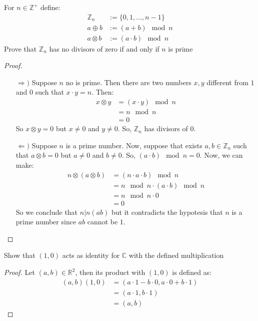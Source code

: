 \documentclass{tufte-handout}
\begin{document}
\begin{problem}
	For $n \in \mathbb{Z}^+$ define:
	\begin{align*}
		\mathbb{Z}_n &:= \{0, 1, \dots, n-1\}\\
		a \oplus b &:= (a+b) \mod n\\
		a \otimes b &:= (a \cdot b) \mod n
	\end{align*}
	Prove that $\mathbb{Z}_n$ has no divisors of zero if and only if $n$ is prime 
\end{problem}
\begin{proof}
	\begin{itemize}
		\item[$\Rightarrow)$] Suppose $n$ no is prime. Then there are two numbers $x, y$ different from $1$ and $0$ such that $x \cdot y = n$. Then:
		\begin{align*}
			x \otimes y &= (x \cdot y) \mod n\\
			&= n \mod n\\
			&= 0
		\end{align*}
		So $x \otimes y = 0$ but $x \neq 0$ and $y \neq 0$. So, $\mathbb{Z}_n$ has divisors of $0$.
		\item[$\Leftarrow)$] Suppose $n$ is a prime number. Now, suppose that exists $a, b \in \mathbb{Z}_n$ such that $a \otimes b = 0$ but $a \neq 0$ and $b \neq 0$. So, $(a \cdot b) \mod n = 0$. Now, we can make:
		\begin{align*}
			n \otimes (a \otimes b) &= (n \cdot a \cdot b) \mod n\\
			&= n \mod n \cdot (a \cdot b) \mod n\\
			&= n \mod n \cdot 0\\
			&= 0
		\end{align*}
		So we conclude that $n | n(ab)$ but it contradicts the hypotesis that $n$ is a prime number since $ab$ cannot be $1$. 
	\end{itemize}
\end{proof}

\begin{problem}
	Show that $(1, 0)$ acts as identity for $\mathbb{C}$ with the defined multiplication
\end{problem}
\begin{proof}
	Let $(a, b) \in \mathbb{R}^2$, then its product with $(1, 0)$ is defined as:
	\begin{align*}
		(a, b)(1, 0) &= (a\cdot 1 - b \cdot 0, a\cdot 0 + b \cdot 1)\\
		&= (a\cdot 1, b\cdot 1)\\
		&= (a, b)
	\end{align*}
\end{proof}
\end{document}
